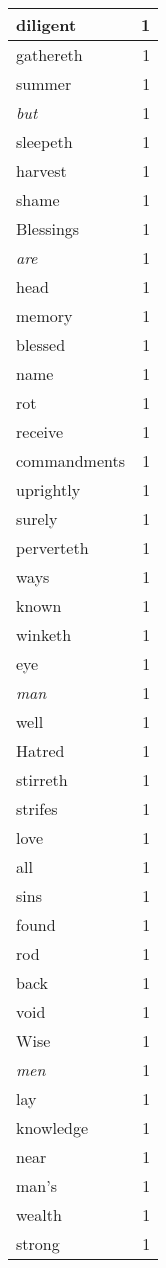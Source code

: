 \begin{center}
\begin{longtable}{l|r}
diligent & 1\\ \hline 
gathereth & 1\\ \hline 
summer & 1\\ \hline 
\emph{but} & 1\\ \hline 
sleepeth & 1\\ \hline 
harvest & 1\\ \hline 
shame & 1\\ \hline 
Blessings & 1\\ \hline 
\emph{are} & 1\\ \hline 
head & 1\\ \hline 
memory & 1\\ \hline 
blessed & 1\\ \hline 
name & 1\\ \hline 
rot & 1\\ \hline 
receive & 1\\ \hline 
commandments & 1\\ \hline 
uprightly & 1\\ \hline 
surely & 1\\ \hline 
perverteth & 1\\ \hline 
ways & 1\\ \hline 
known & 1\\ \hline 
winketh & 1\\ \hline 
eye & 1\\ \hline 
\emph{man} & 1\\ \hline 
well & 1\\ \hline 
Hatred & 1\\ \hline 
stirreth & 1\\ \hline 
strifes & 1\\ \hline 
love & 1\\ \hline 
all & 1\\ \hline 
sins & 1\\ \hline 
found & 1\\ \hline 
rod & 1\\ \hline 
back & 1\\ \hline 
void & 1\\ \hline 
Wise & 1\\ \hline 
\emph{men} & 1\\ \hline 
lay & 1\\ \hline 
knowledge & 1\\ \hline 
near & 1\\ \hline 
man's & 1\\ \hline 
wealth & 1\\ \hline 
strong & 1\\ \hline 

\end{longtable}
\end{center}
